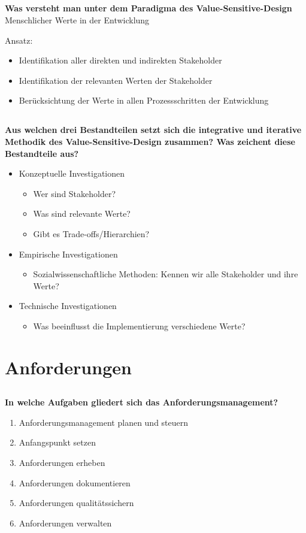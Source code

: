\subsection{}
\textbf{Was versteht man unter dem Paradigma des Value-Sensitive-Design}
Menschlicher Werte in der Entwicklung

Ansatz:
\begin{itemize}
    \item Identifikation aller direkten und indirekten Stakeholder
    \item Identifikation der relevanten Werten der Stakeholder
    \item Berücksichtung der Werte in allen Prozessschritten der Entwicklung
\end{itemize}
\subsection{}
\textbf{Aus welchen drei Bestandteilen setzt sich die integrative und iterative Methodik des Value-Sensitive-Design zusammen? Was zeichent diese Bestandteile aus?}
\begin{itemize}
    \item Konzeptuelle Investigationen\begin{itemize}
              \item Wer sind Stakeholder?
              \item Was sind relevante Werte?
              \item Gibt es Trade-offs/Hierarchien?
          \end{itemize}
    \item Empirische Investigationen\begin{itemize}
              \item Sozialwissenschaftliche Methoden: Kennen wir alle Stakeholder und ihre Werte?
          \end{itemize}
    \item Technische Investigationen\begin{itemize}
              \item Was beeinflusst die Implementierung verschiedene Werte?
          \end{itemize}
\end{itemize}

\section{Anforderungen}
\subsection{}
\textbf{In welche Aufgaben gliedert sich das Anforderungsmanagement?}
\begin{enumerate}
    \item Anforderungsmanagement planen und steuern
    \item Anfangspunkt setzen
    \item Anforderungen erheben
    \item Anforderungen dokumentieren
    \item Anforderungen qualitätssichern
    \item Anforderungen verwalten
\end{enumerate}
